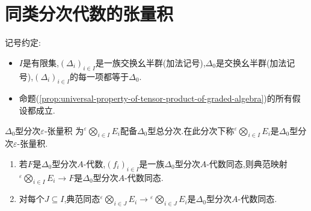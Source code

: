\section{同类分次代数的张量积}

记号约定:
\begin{itemize}
	\item $I$是有限集,$\left(\Delta_{i}\right)_{i\in I}$是一族交换幺半群(加法记号),$\Delta_{0}$是交换幺半群(加法记号),$\left(\Delta_{i}\right)_{i\in I}$的每一项都等于$\Delta_{0}$.
	\item 命题(\ref{prop:universal-property-of-tensor-product-of-graded-algebra})的所有假设都成立.
\end{itemize}

\begin{definition}{$\Delta_{0}$型分次$\varepsilon$-张量积}{}
	为${}^{\varepsilon}\bigotimes\limits_{i\in I}E_{i}$配备$\Delta_{0}$型总分次.在此分次下称${}^{\varepsilon}\bigotimes\limits_{i\in I}E_{i}$是$\Delta_{0}$型分次$\varepsilon$-张量积.
\end{definition}

\begin{proposition}{}{}
	\begin{enumerate}
		\item 若$F$是$\Delta_{0}$型分次$A$-代数,$\left(f_{i}\right)_{i\in I}$是一族$\Delta_{0}$型分次$A$-代数同态,则典范映射${}^{\varepsilon}\bigotimes\limits_{i\in I}E_{i}\to F$是$\Delta_{0}$型分次$A$-代数同态.
		\item 对每个$J\subseteq I$,典范同态${}^{\varepsilon}\bigotimes\limits_{i\in J}E_{i}\to{}^{\varepsilon}\bigotimes\limits_{i\in J}E_{i}$是$\Delta_{0}$型分次$A$-代数同态.
	\end{enumerate}
\end{proposition}

